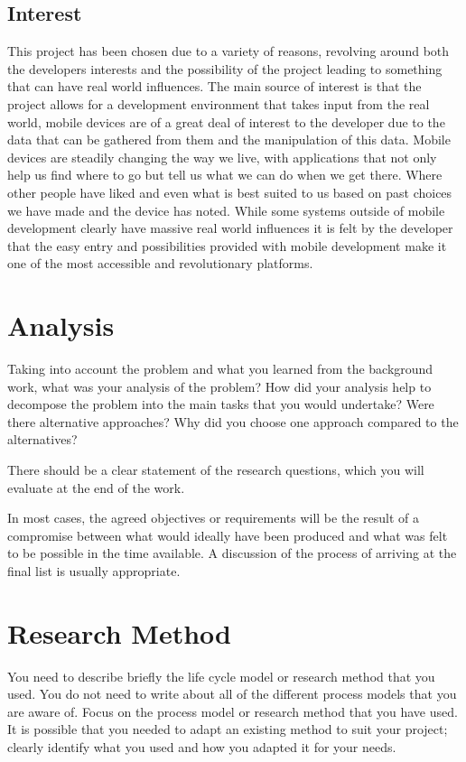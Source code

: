 \subsection{Interest}
This project has been chosen due to a variety of reasons, revolving around both the developers interests and the possibility of the project leading to something that can have real world influences. The main source of interest is that the project allows for a development environment that takes input from the real world, mobile devices are of a great deal of interest to the developer due to the data that can be gathered from them and the manipulation of this data. Mobile devices are steadily changing the way we live, with applications that not only help us find where to go but tell us what we can do when we get there. Where other people have liked and even what is best suited to us based on past choices we have made and the device has noted. While some systems outside of mobile development clearly have massive real world influences it is felt by the developer that the easy entry and possibilities provided with mobile development make it one of the most accessible and revolutionary platforms.



\section{Analysis}
Taking into account the problem and what you learned from the background work, what was your analysis of the problem? How did your analysis help to decompose the problem into the main tasks that you would undertake? Were there alternative approaches? Why did you choose one approach compared to the alternatives? 

There should be a clear statement of the research questions, which you will evaluate at the end of the work. 

In most cases, the agreed objectives or requirements will be the result of a compromise between what would ideally have been produced and what was felt to be possible in the time available. A discussion of the process of arriving at the final list is usually appropriate.

\section{Research Method}
You need to describe briefly the life cycle model or research method that you used. You do not need to write about all of the different process models that you are aware of. Focus on the process model or research method that you have used. It is possible that you needed to adapt an existing method to suit your project; clearly identify what you used and how you adapted it for your needs.
